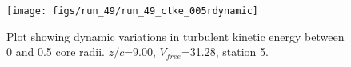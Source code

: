 \begin{figure}[H]
\centering
\texttt{[image: figs/run\_49/run\_49\_ctke\_005rdynamic]}
\caption{Plot showing dynamic variations in turbulent kinetic energy between 0 and 0.5 core radii. $z/c$=9.00, $V_{free}$=31.28, station 5.}
\end{figure}


